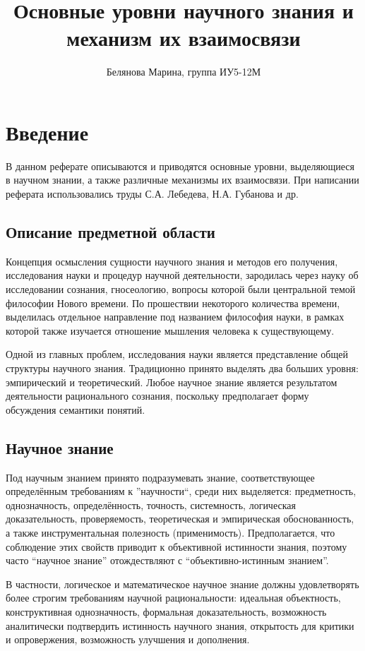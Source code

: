 \documentclass[14pt]{article}
\title{Основные уровни научного знания и механизм их взаимосвязи}
\author{Белянова Марина, группа ИУ5-12М}
\begin{document}
\maketitle
\tableofcontents

\section{Введение}

В данном реферате описываются и приводятся основные уровни, выделяющиеся в научном знании, а также различные механизмы их взаимосвязи. При написании реферата использовались труды С.А. Лебедева, Н.А. Губанова и др.
\subsection{Описание предметной области}
Концепция осмысления сущности научного знания и методов его получения, исследования науки и процедур научной деятельности, зародилась через науку об исследовании сознания, гносеологию, вопросы которой были центральной темой философии Нового времени. По прошествии некоторого количества времени, выделилась отдельное направление под названием философия науки, в рамках которой также изучается отношение мышления человека к существующему.


Одной из главных проблем, исследования науки является представление общей структуры научного знания. Традиционно принято выделять два больших уровня: эмпирический и теоретический. Любое научное знание является результатом деятельности рационального сознания, поскольку предполагает форму обсуждения семантики понятий.
\subsection{Научное знание}
Под научным знанием принято подразумевать знание, соответствующее определённым требованиям к ''научности``, среди них выделяется: предметность, однозначность, определённость, точность, системность, логическая доказательность, проверяемость, теоретическая и эмпирическая обоснованность, а также инструментальная полезность (применимость). Предполагается, что соблюдение этих свойств приводит к объективной истинности знания, поэтому часто ``научное знание'' отождествляют с ``объективно-истинным знанием''.

В частности, логическое и математическое научное знание должны удовлетворять более строгим требованиям научной рациональности: идеальная объектность, конструктивная однозначность, формальная доказательность, возможность аналитически подтвердить истинность научного знания, открытость для критики и опровержения, возможность улучшения и дополнения.
\end{document}
